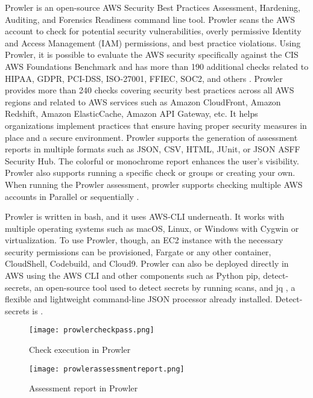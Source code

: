 {\hfill \break
\par Prowler is an open-source AWS Security Best Practices Assessment, Hardening, Auditing, and Forensics Readiness command line tool.
Prowler scans the AWS account to check for potential security vulnerabilities, overly permissive Identity and Access Management (IAM) permissions, and best practice violations.
Using Prowler, it is possible to evaluate the AWS security specifically against the CIS AWS Foundations Benchmark and has more than 190 additional checks related to HIPAA, GDPR, PCI-DSS, ISO-27001, FFIEC, SOC2, and others \cite{75}.
Prowler provides more than 240 checks covering security best practices across all AWS regions and related to AWS services such as Amazon CloudFront, Amazon Redshift, Amazon ElasticCache, Amazon API Gateway, etc.
It helps organizations implement practices that ensure
having proper security measures in place and a secure
environment.
Prowler supports the generation of assessment reports in multiple formats such as JSON, CSV, HTML, JUnit, or JSON ASFF Security Hub.
The colorful or monochrome report enhances the user’s visibility.
Prowler also supports running a specific check or groups or creating your own.
When running the Prowler assessment, prowler supports
checking multiple AWS accounts in Parallel or
sequentially \cite{78}.\\
\hfill \break
\par Prowler is written in bash, and it uses AWS-CLI
underneath.
It works with multiple operating systems such
as macOS, Linux, or Windows with Cygwin or virtualization.
To use Prowler, though, an EC2 instance with the necessary security permissions can be provisioned, Fargate or any other container, CloudShell, Codebuild, and Cloud9.
Prowler can also be deployed directly in AWS using the AWS
CLI and other components such as Python pip,
detect-secrets, an open-source tool used to detect secrets by running scans, and jq , a flexible and lightweight command-line JSON processor already installed.
Detect-secrets is  \cite{78}.
\hfill \break
\begin{figure}
    \centering
    \texttt{[image: prowlercheckpass.png]}
    \caption{Check execution in Prowler}
    \label{fig:prowlercheckexecution}
\end{figure}

\begin{figure}
    \centering
    \texttt{[image: prowlerassessmentreport.png]}
    \caption{Assessment report in Prowler}
    \label{fig:assessmentreport}
\end{figure}

}
